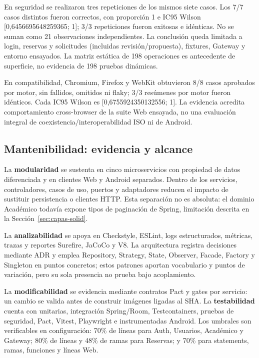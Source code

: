 En seguridad se realizaron tres repeticiones de los mismos siete casos. Los 7/7
casos distintos fueron correctos, con proporción 1 e IC95 Wilson
[0,6456695648259365; 1]; 3/3 repeticiones fueron exitosas e idénticas. No se
suman como 21 observaciones independientes. La conclusión queda limitada a
login, reservas y solicitudes (incluidas revisión/propuesta), fixtures, Gateway
y entorno ensayados. La matriz estática de 198 operaciones es antecedente de
superficie, no evidencia de 198 pruebas dinámicas.

En compatibilidad, Chromium, Firefox y WebKit obtuvieron 8/8 casos aprobados
por motor, sin fallidos, omitidos ni flaky; 3/3 resúmenes por motor fueron
idénticos. Cada IC95 Wilson es [0,6755924350132556; 1]. La evidencia acredita
comportamiento cross-browser de la suite Web ensayada, no una evaluación
integral de coexistencia/interoperabilidad ISO ni de Android.

\subsection{Mantenibilidad: evidencia y alcance}
\label{subsec:mantenibilidad}

La \textbf{modularidad} se sustenta en cinco microservicios con propiedad de
datos diferenciada y en clientes Web y Android separados. Dentro de los
servicios, controladores, casos de uso, puertos y adaptadores reducen el impacto
de sustituir persistencia o clientes HTTP. Esta separación no es absoluta: el
dominio Académico todavía expone tipos de paginación de Spring, limitación
descrita en la Sección~\ref{sec:capas-solid}.

La \textbf{analizabilidad} se apoya en Checkstyle, ESLint, logs estructurados,
métricas, trazas y reportes Surefire, JaCoCo y V8. La arquitectura registra
decisiones mediante ADR y emplea Repository, Strategy, State, Observer, Facade,
Factory y Singleton en puntos concretos; estos patrones aportan vocabulario y
puntos de variación, pero su sola presencia no prueba bajo acoplamiento.

La \textbf{modificabilidad} se evidencia mediante contratos Pact y gates por
servicio: un cambio se valida antes de construir imágenes ligadas al SHA. La
\textbf{testabilidad} cuenta con unitarias, integración Spring/Room,
Testcontainers, pruebas de seguridad, Pact, Vitest, Playwright e instrumentadas
Android. Los umbrales son verificables en configuración: 70\% de líneas para
Auth, Usuarios, Académico y Gateway; 80\% de líneas y 48\% de ramas para
Reservas; y 70\% para statements, ramas, funciones y líneas Web.

